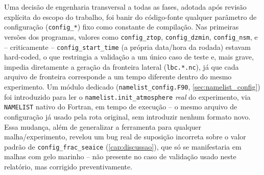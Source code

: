 Uma decisão de engenharia transversal a todas as fases, adotada após
revisão explícita do escopo do trabalho, foi banir do código-fonte
qualquer parâmetro de configuração (\texttt{config\_*}) fixo como
constante de compilação. Nas primeiras versões dos programas, valores
como \texttt{config\_ztop}, \texttt{config\_dzmin},
\texttt{config\_nsm}, e -- criticamente -- \texttt{config\_start\_time}
(a própria data/hora da rodada) estavam hard-coded, o que restringia a
validação a um único caso de teste e, mais grave, impedia diretamente a
geração da fronteira lateral (\texttt{lbc.*.nc}), já que cada arquivo de
fronteira corresponde a um tempo diferente dentro do mesmo experimento.
Um módulo dedicado (\texttt{namelist\_config.F90},
\cref{sec:namelist_config}) foi introduzido para ler o
\texttt{namelist.init\_atmosphere} \emph{real} do experimento, via
\texttt{NAMELIST} nativo do Fortran, em tempo de execução -- o mesmo
arquivo de configuração já usado pela rota original, sem introduzir
nenhum formato novo. Essa mudança, além de generalizar a ferramenta para
qualquer malha/experimento, revelou um bug real de suposição incorreta
sobre o valor padrão de \texttt{config\_frac\_seaice}
(\cref{cap:discussao}), que só se manifestaria em malhas com gelo
marinho -- não presente no caso de validação usado neste relatório, mas
corrigido preventivamente.
